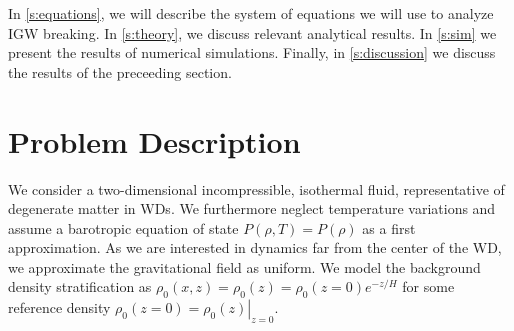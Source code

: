 \documentclass[
        fleqn,
        usenatbib,
    ]{mnras}
\newcommand*{\at}[1]{\left.#1\right|}
\begin{document}




In \autoref{s:equations}, we will describe the system of equations we will
use to analyze IGW breaking. In \autoref{s:theory}, we discuss relevant
analytical results. In \autoref{s:sim} we present the results of numerical
simulations. Finally, in \autoref{s:discussion} we discuss the results of the
preceeding section.

\section{Problem Description}\label{s:equations}

We consider a two-dimensional incompressible, isothermal fluid, representative
of degenerate matter in WDs. We furthermore neglect temperature variations and
assume a barotropic equation of state $P(\rho, T) = P(\rho)$ as a first
approximation. As we are interested in dynamics far from the center of the WD,
we approximate the gravitational field as uniform. We model the background
density stratification as $\rho_0(x, z) = \rho_0(z) = \rho_0(z=0) e^{-z/H}$ for
some reference density $\rho_0(z=0) = \at{\rho_0(z)}_{z = 0}$.
\end{document}
